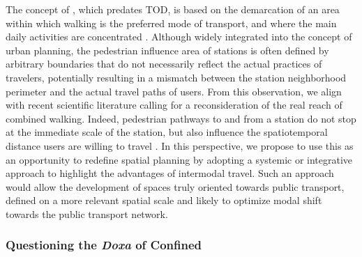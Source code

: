 \begin{refsegment}
The concept of , which predates \acrshort{TOD}, is based on the demarcation of an area within which walking is the preferred mode of transport, and where the main daily activities are concentrated \textcolor{blue}{\autocite[3]{kelbaugh_pedestrian_1989}}. Although widely integrated into the concept of urban planning, the pedestrian influence area of stations is often defined by arbitrary boundaries that do not necessarily reflect the actual practices of travelers, potentially resulting in a mismatch between the station neighborhood perimeter and the actual travel paths of users. From this observation, we align with recent scientific literature calling for a reconsideration of the real reach of combined walking. Indeed, pedestrian pathways to and from a station do not stop at the immediate scale of the station, but also influence the spatiotemporal distance users are willing to travel \textcolor{blue}{\autocite[52]{el_hadeuf_ville_2017}}. In this perspective, we propose to use this  \textcolor{blue}{\autocite[33]{guerra_half-mile_2012}} as an opportunity to redefine spatial planning by adopting a systemic or integrative approach \textcolor{blue}{\autocite[56]{kaufmann_retour_2014}} to highlight the advantages of intermodal travel. Such an approach would allow the development of spaces truly oriented towards public transport, defined on a more relevant spatial scale and likely to optimize modal shift towards the public transport network.%

\subsubsection*{Questioning the \textsl{Doxa} of Confined 
    \label{chap1:btod-limites-tod-marche-restreinte}
    }


\end{refsegment}
